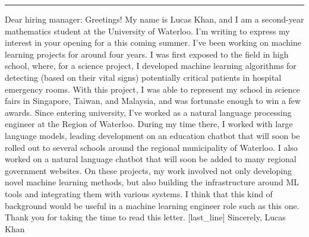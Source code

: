 \documentclass[12pt]{article}
\newcommand{\position}{}
\begin{document}
\begin{minipage}[t]{0.63\textwidth}
  \vspace{0pt}
  \rule{\linewidth}{3px} %
  \newline \newline
  Dear hiring manager:
  \newline \newline
  Greetings! My name is Lucas Khan, and I am a second-year mathematics student at the University of Waterloo. I’m writing to express my interest in your opening for a \position this coming summer.
  \newline \newline
  I've been working on machine learning projects for around four years. I was first exposed to the field in high school, where, for a science project, I developed machine learning algorithms for detecting (based on their vital signs) potentially critical patients in hospital emergency rooms. With this project, I was able to represent my school in science fairs in Singapore, Taiwan, and Malaysia, and was fortunate enough to win a few awards.
  \newline \newline
  Since entering university, I've worked as a natural language processing engineer at the Region of Waterloo. During my time there, I worked with large language models, leading development on an education chatbot that will soon be rolled out to several schools around the regional municipality of Waterloo. I also worked on a natural language chatbot that will soon be added to many regional government websites. On these projects, my work involved not only developing novel machine learning methods, but also building the infrastructure around ML tools and integrating them with various systems. I think that this kind of background would be useful in a machine learning engineer role such as this one.
  \newline \newline
  Thank you for taking the time to read this letter. [last_line]
  \newline \newline
  Sincerely,
  \newline \newline \newline
  Lucas Khan
\end{minipage}
\end{document}
